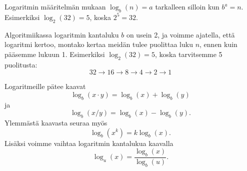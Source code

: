 Logaritmin määritelmän mukaan $\log_b(n)=a$
tarkalleen silloin kun $b^a=n$.
Esimerkiksi $\log_2(32)=5$, koska $2^5=32$.

Algoritmiikassa logaritmin kantaluku $b$ on usein 2,
ja voimme ajatella, että logaritmi kertoo, montako kertaa
meidän tulee puolittaa luku $n$, ennen kuin pääsemme lukuun 1.
Esimerkiksi $\log_2(32)=5$, koska tarvitsemme 5 puolitusta:
\[32 \rightarrow 16 \rightarrow 8 \rightarrow 4 \rightarrow 2 \rightarrow 1\]

Logaritmeille pätee kaavat
\[\log_b(x \cdot y) = \log_b(x)+\log_b(y)\]
ja
\[\log_b(x / y) = \log_b(x)-\log_b(y).\]
Ylemmästä kaavasta seuraa myös
\[\log_b(x^k) = k \log_b(x).\]
Lisäksi voimme vaihtaa logaritmin kantalukua kaavalla
\[\log_u(x) = \frac{\log_b(x)}{\log_b(u)}.\]